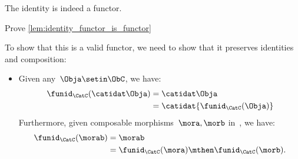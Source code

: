 \begin{lemma}
    \label{lem:identity_functor_is_functor}
    The identity  is indeed a functor.
\end{lemma}

\begin{exercise}
    Prove \cref{lem:identity_functor_is_functor}
\end{exercise}
\begin{solution}
    To show that this is a valid functor, we need to show that it preserves identities and composition:
    \begin{itemize}
        \item Given any~$\Obja \setin \ObC$, we have:
              \begin{equation}
                  \begin{aligned}
                      \funid_{\CatC}(\catidat\Obja) & =\catidat\Obja \\
                                                    & =\catidat{\funid_{\CatC}(\Obja)}
                  \end{aligned}
              \end{equation}
              Furthermore, given composable morphisms~$\mora,\morb$ in~\CatC, we have:
              \begin{equation}
                  \begin{aligned}
                      \funid_{\CatC}(\morab) & =\morab \\
                                             & =\funid_{\CatC}(\mora)\mthen \funid_{\CatC} (\morb).
                  \end{aligned}
              \end{equation}
    \end{itemize}
\end{solution}
